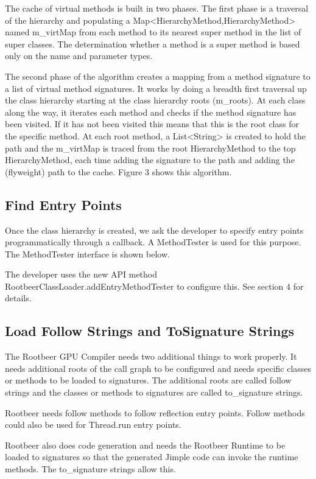 \documentclass[preprint]{sigplanconf}
\begin{document}
The cache of virtual methods is built in two phases. The first phase is a traversal of the hierarchy and populating a Map<HierarchyMethod,HierarchyMethod> named m\_virtMap from each method to its nearest super method in the list of super classes. The determination whether a method is a super method is based only on the name and parameter types.

The second phase of the algorithm creates a mapping from a method signature to a list of virtual method signatures. It works by doing a breadth first traversal up the class hierarchy starting at the class hierarchy roots (m\_roots). At each class along the way, it iterates each method and checks if the method signature has been visited. If it has not been visited this means that this is the root class for the specific method. At each root method, a List<String> is created to hold the path and the m\_virtMap is traced from the root HierarchyMethod to the top HierarchyMethod, each time adding the signature to the path and adding the (flyweight) path to the cache. Figure 3 shows this algorithm.

\subsection{Find Entry Points}
Once the class hierarchy is created, we ask the developer to specify entry points programmatically through a callback. A MethodTester is used for this purpose. The MethodTester interface is shown below.

The developer uses the new API method RootbeerClassLoader.addEntryMethodTester to configure this. See section 4 for details.

\subsection{Load Follow Strings and ToSignature Strings}
The Rootbeer GPU Compiler needs two additional things to work properly. It needs additional roots of the call graph to be configured and needs specific classes or methods to be loaded to signatures. The additional roots are called follow strings and the classes or methods to signatures are called to\_signature strings.

Rootbeer needs follow methods to follow reflection entry points. Follow methods could also be used for Thread.run entry points.
 
Rootbeer also does code generation and needs the Rootbeer Runtime to be loaded to signatures so that the generated Jimple code can invoke the runtime methods. The to\_signature strings allow this. 
\end{document}
